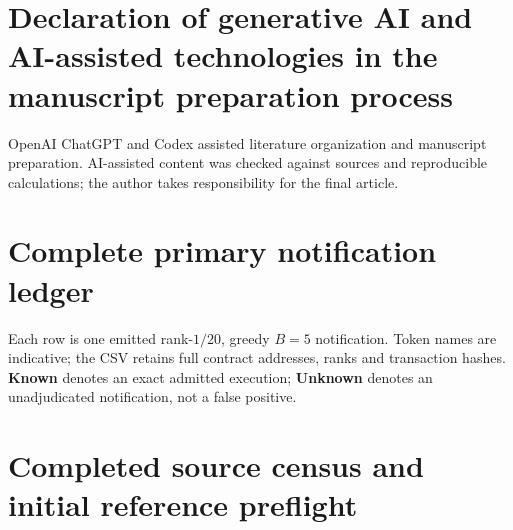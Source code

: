 \documentclass[preprint,12pt,authoryear]{elsarticle}
\begin{document}
\section*{Declaration of generative AI and AI-assisted technologies in the manuscript preparation process}
OpenAI ChatGPT and Codex assisted literature organization and manuscript preparation. AI-assisted content was checked against sources and reproducible calculations; the author takes responsibility for the final article.

\appendix
\renewcommand{\theHtable}{appendix.\Alph{section}.\arabic{table}}
\section{Complete primary notification ledger}\label{app:alerts}
\setcounter{table}{0}
Each row is one emitted rank-$1/20$, greedy $B=5$ notification. Token names are indicative; the CSV retains full contract addresses, ranks and transaction hashes. \textbf{Known} denotes an exact admitted execution; \textbf{Unknown} denotes an unadjudicated notification, not a false positive.


\section{Completed source census and initial reference preflight}\label{app:sourcecensus}
\setcounter{table}{0}



\begingroup\footnotesize\setlength{\bibsep}{2pt}\sloppy\endgroup
\end{document}
